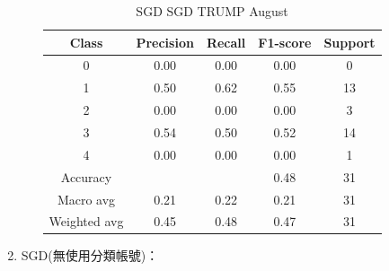 \begin{enumerate}
\begin{enumerate}
\begin{table}[H]
                \vspace{1em}
                
                \scriptsize
                \begin{tabular}{c|cccc}
                \hline
                Class & Precision & Recall & F1-score & Support \\
                \hline
                0 & 0.00 & 0.00 & 0.00 & 0 \\
                1 & 0.50 & 0.62 & 0.55 & 13 \\
                2 & 0.00 & 0.00 & 0.00 & 3 \\
                3 & 0.54 & 0.50 & 0.52 & 14 \\
                4 & 0.00 & 0.00 & 0.00 & 1 \\
                \hline
                Accuracy &       &      & 0.48 & 31 \\
                Macro avg & 0.21 & 0.22 & 0.21 & 31 \\
                Weighted avg & 0.45 & 0.48 & 0.47 & 31 \\
                \hline
                \end{tabular}
                \caption{SGD SGD TRUMP August}
                \label{tab:classifier_2_report_sgd_sgd_trump_filtered_aug}
                \end{table}


    
    
                
            \end{enumerate}


        \pagebreak

        \item SGD(無使用分類帳號)：


\end{enumerate}
